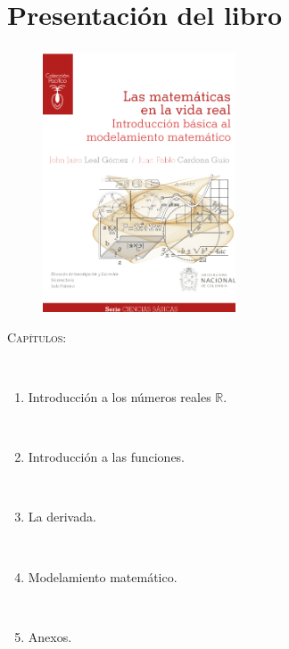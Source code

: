 \section{Presentación del libro}

\begin{frame}
	\frametitle{\secname}
	\begin{minipage}{0.47\textwidth}
		\begin{figure}[ht!]
			\centering
			\includegraphics[height=7.7cm]{portada}
		\end{figure}
	\end{minipage}
	\begin{minipage}{0.5\textwidth}
		\textsc{\Large Capítulos:}

		\

		\begin{enumerate}
			\item

			      Introducción a los números reales $\mathbb{R}$.

			      \

			\item

			      Introducción a las funciones.

			      \

			\item

			      La derivada.

			      \

			\item

			      Modelamiento matemático.

			      \

			\item

			      Anexos.
		\end{enumerate}
	\end{minipage}
\end{frame}

